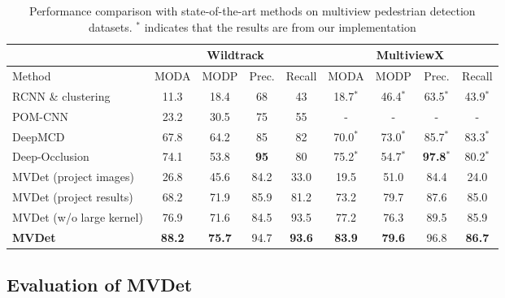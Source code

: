 \documentclass[runningheads]{llncs}
\begin{document}
\begin{table}[t]
\centering
\caption{Performance comparison with state-of-the-art methods on multiview pedestrian detection datasets. $^*$ indicates that the results are from our implementation }
\begin{tabular}{l||c|c|c|c||c|c|c|c}
\toprule
                        & \multicolumn{4}{c||}{Wildtrack}                              & \multicolumn{4}{c}{MultiviewX}                               \\ \hline
Method                  & MODA          & MODP          & Prec.   & Recall        & MODA          & MODP          & Prec.     & Recall        \\ \hline
RCNN \& clustering      & 11.3          & 18.4          & 68          & 43            & 18.7$^*$          & 46.4$^*$          & 63.5$^*$          & 43.9$^*$          \\ \hline
POM-CNN                 & 23.2          & 30.5          & 75          & 55            & -             & -             & -             & -             \\ \hline
DeepMCD                 & 67.8          & 64.2          & 85          & 82            & 70.0$^*$          & 73.0$^*$          & 85.7$^*$          & 83.3$^*$          \\ \hline
Deep-Occlusion          & 74.1          & 53.8          & \textbf{95} & 80            & 75.2$^*$          & 54.7$^*$          & \textbf{97.8}$^*$ & 80.2$^*$          \\ \hline\hline
MVDet (project images)        & 26.8          & 45.6          & 84.2        & 33.0          & 19.5          & 51.0          & 84.4          & 24.0          \\ \hline
MVDet (project results)       & 68.2          & 71.9          & 85.9        & 81.2          & 73.2          & 79.7          & 87.6          & 85.0          \\ \hline
MVDet (w/o large kernel) & 76.9          & 71.6          & 84.5        & 93.5          & 77.2          & 76.3          & 89.5          & 85.9 \\  \hline
\textbf{MVDet} & \textbf{88.2} & \textbf{75.7} & 94.7        & \textbf{93.6} & \textbf{83.9} & \textbf{79.6} & 96.8          & \textbf{86.7}          \\
\bottomrule
\end{tabular}
\label{tab:sota}
\end{table}


\subsection{Evaluation of MVDet}
\label{sec:sec:evaluation}
\end{document}
